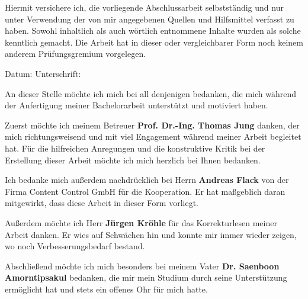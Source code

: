 \label{erklaerung}

Hiermit versichere ich, die vorliegende Abschlussarbeit selbstständig und nur unter Verwendung der von mir angegebenen Quellen und Hilfsmittel verfasst zu haben. Sowohl inhaltlich als auch wörtlich entnommene Inhalte wurden als solche kenntlich gemacht. Die Arbeit hat in dieser oder vergleichbarer Form noch keinem anderem Prüfungsgremium vorgelegen.\bigskip
\bigskip
\bigskip

Datum:	\hrulefill\enspace Unterschrift: \hrulefill

\newpage
{}
\label{danksagungen}
An dieser Stelle möchte ich mich bei all denjenigen bedanken, die mich während der Anfertigung meiner Bachelorarbeit unterstützt und motiviert haben.\bigskip

Zuerst möchte ich meinem Betreuer \textbf{Prof. Dr.-Ing. Thomas Jung} danken, der mich richtungsweisend und mit viel Engagement während meiner Arbeit begleitet hat. Für die hilfreichen Anregungen und die konstruktive Kritik bei der Erstellung dieser Arbeit möchte ich mich herzlich bei Ihnen bedanken.\bigskip

Ich bedanke mich außerdem nachdrücklich bei Herrn \textbf{Andreas Flack} von der Firma Content Control GmbH für die Kooperation. Er hat maßgeblich daran mitgewirkt, dass diese Arbeit in dieser Form vorliegt.\bigskip

Außerdem möchte ich Herr \textbf{Jürgen Kröhle} für das Korrekturlesen meiner Arbeit danken. Er wies auf Schwächen hin und konnte mir immer wieder zeigen, wo noch Verbesserungsbedarf bestand.\bigskip

Abschließend möchte ich mich besonders bei meinem Vater \textbf{Dr. Saenboon Amorntipsakul} bedanken, die mir mein Studium durch seine Unterstützung ermöglicht hat und stets ein offenes Ohr für mich hatte.  


